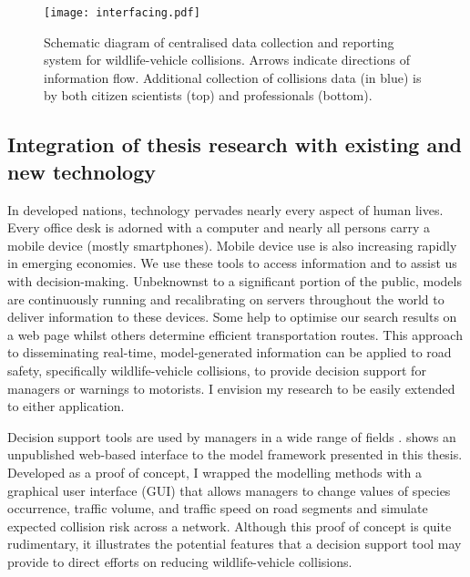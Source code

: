 \begin{figure*}[!t]
  \centering
  \texttt{[image: interfacing.pdf]}
  \caption[Centralised data collection and reporting system]{Schematic diagram of centralised data collection and reporting system for wildlife-vehicle collisions. Arrows indicate directions of information flow. Additional collection of collisions data (in blue) is by both citizen scientists (top) and professionals (bottom).}
  \label{wvc_server}
\end{figure*}

\subsection{Integration of thesis research with existing and new technology}

In developed nations, technology pervades nearly every aspect of human lives. Every office desk is adorned with a computer and nearly all persons carry a mobile device (mostly smartphones). Mobile device use is also increasing rapidly in emerging economies. We use these tools to access information and to assist us with decision-making. Unbeknownst to a significant portion of the public, models are continuously running and recalibrating on servers throughout the world to deliver information to these devices. Some help to optimise our search results on a web page whilst others determine efficient transportation routes. This approach to disseminating real-time, model-generated information can be applied to road safety, specifically wildlife-vehicle collisions, to provide decision support for managers or warnings to motorists. I envision my research to be easily extended to either application.

Decision support tools are used by managers in a wide range of fields \citep{shim02}.  shows an unpublished web-based interface to the model framework presented in this thesis. Developed as a proof of concept, I wrapped the modelling methods with a graphical user interface (GUI) that allows managers to change values of species occurrence, traffic volume, and traffic speed on road segments and simulate expected collision risk across a network. Although this proof of concept is quite rudimentary, it illustrates the potential features that a decision support tool may provide to direct efforts on reducing wildlife-vehicle collisions.

